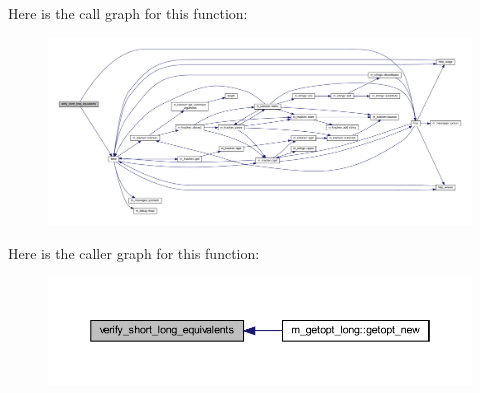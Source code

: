 Here is the call graph for this function\+:
\nopagebreak
\begin{figure}[H]
\begin{center}
\leavevmode
\includegraphics[width=350pt]{M__getopt__long_8f90_aa269c37cf5c19077d40736e1d0557e3d_cgraph}
\end{center}
\end{figure}
Here is the caller graph for this function\+:
\nopagebreak
\begin{figure}[H]
\begin{center}
\leavevmode
\includegraphics[width=350pt]{M__getopt__long_8f90_aa269c37cf5c19077d40736e1d0557e3d_icgraph}
\end{center}
\end{figure}
